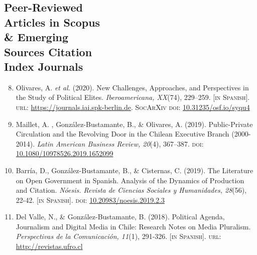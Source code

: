 \documentclass[letterpaper,margin]{res}
\newenvironment{benumerate}[1]{
    \let\oldItem\item
    \def\item{\addtocounter{enumi}{-2}\oldItem}
    \begin{enumerate}
    \setcounter{enumi}{#1}
    \addtocounter{enumi}{1}
}{
    \end{enumerate}
}
\begin{document}
\begin{resume}

\section{\footnotesize Peer-Reviewed \\ Articles in Scopus \\ \& Emerging \\ Sources Citation \\ Index Journals}

\begin{benumerate}{7}
\item{\small Olivares, A. {\itshape et al.} (2020). New Challenges, Approaches, and Perspectives in the Study of Political Elites. {\itshape Iberoamericana, XX}(74), 229--259. {\footnotesize \scshape [in Spanish]}. {\scshape url}: \href{https://journals.iai.spk-berlin.de/index.php/iberoamericana/article/view/2736}{https://journals.iai.spk-berlin.de}. {\scshape {\footnotesize SocArXiv} doi}: \href{https://doi.org/10.31235/osf.io/syqu4}{10.31235/osf.io/syqu4}}\vspace{1mm}

\item{\small Maillet, A. , Gonz\'alez-Bustamante, B., \& Olivares, A. (2019). Public-Private Circulation and the Revolving Door in the Chilean Executive Branch (2000-2014). {\itshape Latin American Business Review, 20}(4), 367--387. {\scshape doi}: \href{https://doi.org/10.1080/10978526.2019.1652099}{10.1080/10978526.2019.1652099}}\vspace{1mm}

\item{\small Barr\'ia, D., Gonz\'alez-Bustamante, B., \& Cisternas, C. (2019). The Literature on Open Government in Spanish. Analysis of the Dynamics of Production and Citation. {\itshape N\'oesis. Revista de Ciencias Sociales y Humanidades, 28}(56), 22-42. {\footnotesize \scshape [in Spanish]}. {\scshape doi}: \href{http://dx.doi.org/10.20983/noesis.2019.2.3}{10.20983/noesis.2019.2.3}}\vspace{1mm}

\item{\small Del Valle, N., \& Gonz\'alez-Bustamante, B. (2018). Political Agenda, Journalism and Digital Media in Chile: Research Notes on Media Pluralism. {\itshape Perspectivas de la Comunicaci\'on, 11}(1), 291-326. {\footnotesize \scshape [in Spanish]}. {\scshape url}: \href{http://revistas.ufro.cl/ojs/index.php/perspectivas/article/view/1146}{http://revistas.ufro.cl}}\vspace{1mm}


\end{benumerate}
\end{resume}
\end{document}

